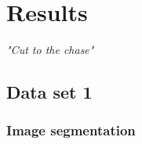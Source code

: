 \chapter{Results}
\begin{center}
\vspace{-6ex}
\textit{"Cut to the chase"}
\vspace{6ex}
\end{center}

\section{Data set 1}

\subsection{Image segmentation}

